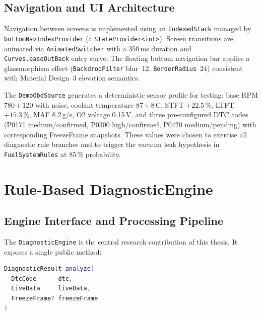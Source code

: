 \subsection{Navigation and UI Architecture}

Navigation between screens is implemented using an \texttt{IndexedStack} managed by \texttt{bottomNavIndexProvider} (a \texttt{StateProvider<int>}).
Screen transitions are animated via \texttt{AnimatedSwitcher} with a 350\,ms duration and \texttt{Curves.easeOutBack} entry curve.
The floating bottom navigation bar applies a glassmorphism effect (\texttt{BackdropFilter} blur~12, \texttt{BorderRadius}~24) consistent with Material Design~3 elevation semantics.

The \texttt{DemoObdSource} generates a deterministic sensor profile for testing: base RPM 780\,$\pm$\,120 with noise, coolant temperature 87\,$\pm$\,8\,\textdegree C, STFT $+22.5\,\%$, LTFT $+15.3\,\%$, MAF 8.2\,g/s, O2 voltage 0.15\,V, and three pre-configured DTC codes (P0171 medium/confirmed, P0300 high/confirmed, P0420 medium/pending) with corresponding FreezeFrame snapshots.
These values were chosen to exercise all diagnostic rule branches and to trigger the vacuum leak hypothesis in \texttt{FuelSystemRules} at 85\,\% probability.

\section{Rule-Based DiagnosticEngine}
\label{sec:engine}

\subsection{Engine Interface and Processing Pipeline}

The \texttt{DiagnosticEngine} is the central research contribution of this thesis.
It exposes a single public method:

\begin{lstlisting}[language=Java, caption={DiagnosticEngine public interface},
                   label={lst:engine_interface}]
DiagnosticResult analyze(
  DtcCode      dtc,
  LiveData     liveData,
  FreezeFrame? freezeFrame
)
\end{lstlisting}

